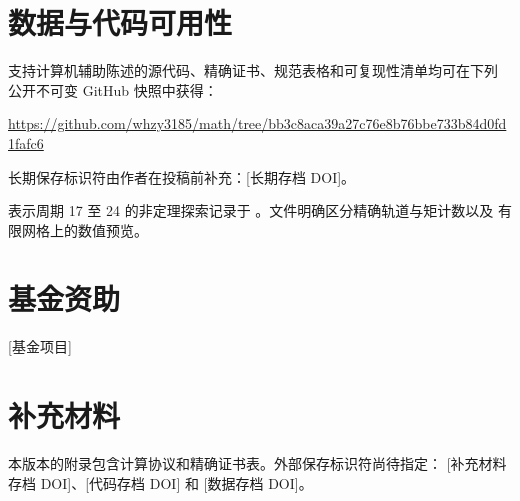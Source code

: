 \section*{数据与代码可用性}
支持计算机辅助陈述的源代码、精确证书、规范表格和可复现性清单均可在下列
公开不可变 GitHub 快照中获得：
\begin{center}
\url{https://github.com/whzy3185/math/tree/bb3c8aca39a27c76e8b76bbe733b84d0fd1fafc6}
\end{center}
长期保存标识符由作者在投稿前补充：[长期存档 DOI]。

表示周期 17 至 24 的非定理探索记录于
\allowbreak
{}。文件明确区分精确轨道与矩计数以及
有限网格上的数值预览。

\section*{基金资助}
[基金项目]

\section*{补充材料}
本版本的附录包含计算协议和精确证书表。外部保存标识符尚待指定：
[补充材料存档 DOI]、[代码存档 DOI] 和 [数据存档 DOI]。
